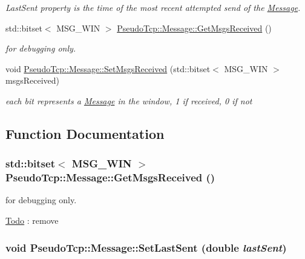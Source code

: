 \begin{DoxyCompactItemize}
\begin{DoxyCompactList}\small\item\em LastSent property is the time of the most recent attempted send of the \hyperlink{classPseudoTcp_1_1Message}{Message}. \item\end{DoxyCompactList}\item 
std::bitset$<$ MSG\_\-WIN $>$ \hyperlink{group__group1_gaa74cf86697d336a90508f375067e02ef}{PseudoTcp::Message::GetMsgsReceived} ()
\begin{DoxyCompactList}\small\item\em for debugging only. \item\end{DoxyCompactList}\item 
\hypertarget{group__group1_gaaf86c7594534b605b19a0f7843c02e93}{
void \hyperlink{group__group1_gaaf86c7594534b605b19a0f7843c02e93}{PseudoTcp::Message::SetMsgsReceived} (std::bitset$<$ MSG\_\-WIN $>$ msgsReceived)}
\label{group__group1_gaaf86c7594534b605b19a0f7843c02e93}

\begin{DoxyCompactList}\small\item\em each bit represents a \hyperlink{classPseudoTcp_1_1Message}{Message} in the window, 1 if received, 0 if not \item\end{DoxyCompactList}\end{DoxyCompactItemize}


\subsection{Function Documentation}
\hypertarget{group__group1_gaa74cf86697d336a90508f375067e02ef}{
\subsubsection[{GetMsgsReceived}]{\setlength{\rightskip}{0pt plus 5cm}std::bitset$<$ MSG\_\-WIN $>$ PseudoTcp::Message::GetMsgsReceived ()}}
\label{group__group1_gaa74cf86697d336a90508f375067e02ef}


for debugging only. 

\begin{Desc}
\item[\hyperlink{todo__todo000001}{Todo}]: remove \end{Desc}
\hypertarget{group__group1_ga8d775b77bb73f7db77e0f8fec82b9a26}{
\subsubsection[{SetLastSent}]{\setlength{\rightskip}{0pt plus 5cm}void PseudoTcp::Message::SetLastSent (double {\em lastSent})}}
\label{group__group1_ga8d775b77bb73f7db77e0f8fec82b9a26}


